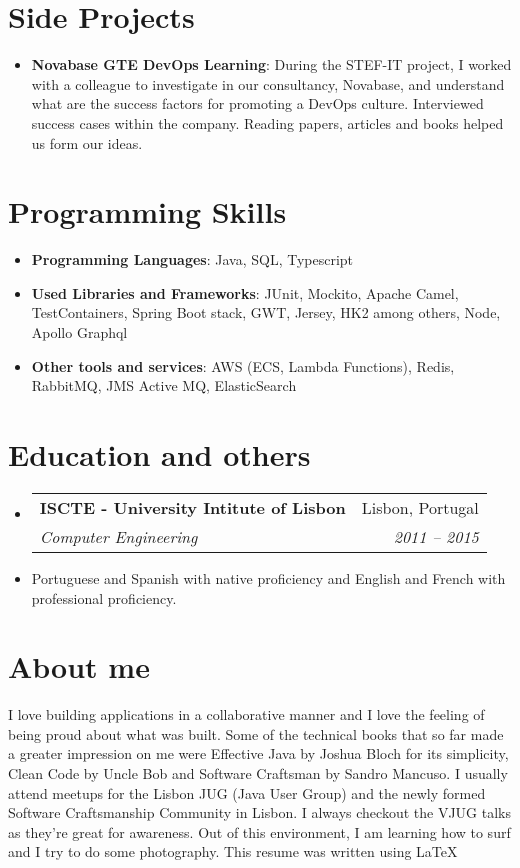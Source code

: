 \documentclass[letterpaper,11pt]{article}
\makeatletter
\newcommand{\resumeItem}[2]{
  \item\small{
    \textbf{#1}{: #2 \vspace{-4pt}}
  }
}
\newcommand{\resumeItemSimple}[1]{
  \item\small{
    {#1 \vspace{-2pt}}
  }
}
\newcommand{\resumeSubheading}[4]{
  \vspace{-2pt}\item
    \begin{tabular*}{0.97\textwidth}[t]{l@{\extracolsep{\fill}}r}
      \textbf{#1} & #2 \\
      \textit{\small#3} & \textit{\small #4} \\
    \end{tabular*}\vspace{-2pt}
}
\newcommand{\resumeSubItem}[2]{\resumeItem{#1}{#2}\vspace{-5pt}}
\newcommand{\resumeSubHeadingListStart}{\begin{itemize}[leftmargin=*]}
\newcommand{\resumeSubHeadingListEnd}{\end{itemize}}
\makeatother
\begin{document}
\section{Side Projects}
  \resumeSubHeadingListStart
    \resumeSubItem{Novabase GTE DevOps Learning}
      {During the STEF-IT project, I worked with a colleague to investigate in our consultancy, Novabase, and understand what are the success factors for promoting a DevOps culture. Interviewed success cases within the company. Reading papers, articles and books helped us form our ideas.}
  \resumeSubHeadingListEnd

\section{Programming Skills}
  \resumeSubHeadingListStart
    \resumeItemSimple
      {\textbf{Programming Languages}: Java, SQL, Typescript}
    \resumeItemSimple
      {\textbf{Used Libraries and Frameworks}: JUnit, Mockito, Apache Camel, TestContainers, Spring Boot stack, GWT, Jersey, HK2 among others, Node, Apollo Graphql}
    \resumeItemSimple
      {\textbf{Other tools and services}: AWS (ECS, Lambda Functions), Redis, RabbitMQ, JMS Active MQ, ElasticSearch}
  \resumeSubHeadingListEnd

\section{Education and others}
  \resumeSubHeadingListStart
    \resumeSubheading
      {ISCTE - University Intitute of Lisbon}{Lisbon, Portugal}
      {Computer Engineering}{2011 -- 2015}
    \resumeItemSimple
      {Portuguese and Spanish with native proficiency and English and French with professional proficiency.}
  \resumeSubHeadingListEnd
  
\section{About me}
  \small{I love building applications in a collaborative manner and I love the feeling of being proud about what was built.\newline
  Some of the technical books that so far made a greater impression on me were Effective Java by Joshua Bloch for its simplicity, Clean Code by Uncle Bob and Software Craftsman by Sandro Mancuso. 
  I usually attend meetups for the Lisbon JUG (Java User Group) and the newly formed Software Craftsmanship Community in Lisbon. I always checkout the VJUG talks as they're great for awareness.
  Out of this environment, I am learning how to surf and I try to do some photography.
  \newline
  This resume was written using \LaTeX
  }
\end{document}

